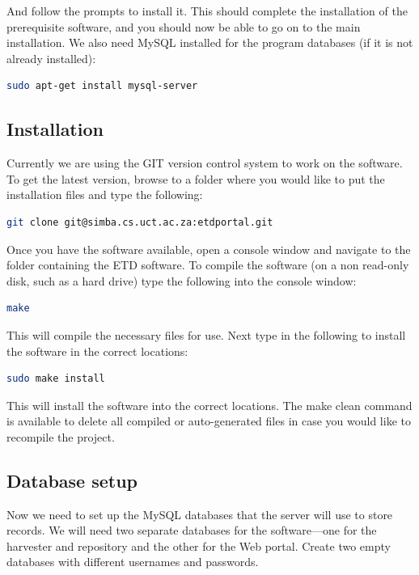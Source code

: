 \documentclass[a4paper,11pt]{article}
\begin{document}
And follow the prompts to install it. This should complete the installation of the prerequisite software, and you should now be able to go on to the main installation. We also need MySQL installed for the program databases (if it is not already installed): 

\begin{lstlisting}[language=bash]
 sudo apt-get install mysql-server
\end{lstlisting}

\subsection{Installation}

Currently we are using the GIT version control system to work on the software. To get the latest version, browse to a folder where you would like to put the installation files and type the following:

\begin{lstlisting}[language=bash]
git clone git@simba.cs.uct.ac.za:etdportal.git 
\end{lstlisting}

Once you have the software available, open a console window and navigate to the folder containing the ETD software. To compile the software (on a non read-only disk, such as a hard drive) type the following into the console window: 

\begin{lstlisting}[language=bash]
 make
\end{lstlisting}

This will compile the necessary files for use. Next type in the following to install the software in the correct locations: 

\begin{lstlisting}[language=bash]
 sudo make install
\end{lstlisting}

This will install the software into the correct locations. The make clean command is available to delete all compiled or auto-generated files in case you would like to recompile the project.

\subsection{Database setup}

Now we need to set up the MySQL databases that the server will use to store records. We will need two separate databases for the software---one for the harvester and repository and the other for the Web portal. Create two empty databases with different usernames and passwords. 
\end{document}
